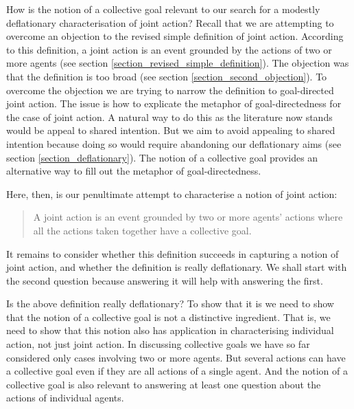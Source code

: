 \documentclass[12pt,a4paper]{extarticle}
\begin{document}
How is the notion of a collective goal relevant to our search for  a modestly deflationary characterisation of joint action? 
Recall that we are attempting to overcome an objection to the revised simple definition of joint action.
According to this definition, a joint action is an event grounded by the actions of two or more agents 
(see section \ref{section_revised_simple_definition}).
The objection was that the definition is too broad
(see section \ref{section_second_objection}).
To overcome the objection we are trying to narrow the definition to goal-directed joint action.
The issue is how to explicate  the metaphor of goal-directedness for the case of joint action.
A natural way to do this as the literature now stands  would be appeal to shared intention.
But we aim to avoid appealing to shared intention because doing so  would require abandoning our deflationary aims
(see section \ref{section_deflationary}).
The notion of a collective goal provides an alternative way to fill out the metaphor of goal-directedness.

Here, then, is our penultimate attempt to characterise a notion of joint action:
%
\begin{quote}
	A joint action is an event grounded by two or more agents' actions 
	where all the actions taken together 
	have a collective goal.
\end{quote}
%
It remains to consider whether this definition succeeds in capturing a notion of joint action, and whether the definition is really deflationary.
We shall start with the second question because answering it will help with answering the first.

Is the above definition really deflationary?
To show that it is we need to show that the notion of a collective goal is not a distinctive ingredient. 
That is, we need to show that this notion also has application in characterising individual action, not just joint action.
In discussing collective goals we have so far considered only cases involving two or more agents.
But  several actions can have a collective goal even if they are all actions of a single agent.
And  the notion of a collective goal is also relevant to answering at least one question about the actions of individual agents.
\end{document}
